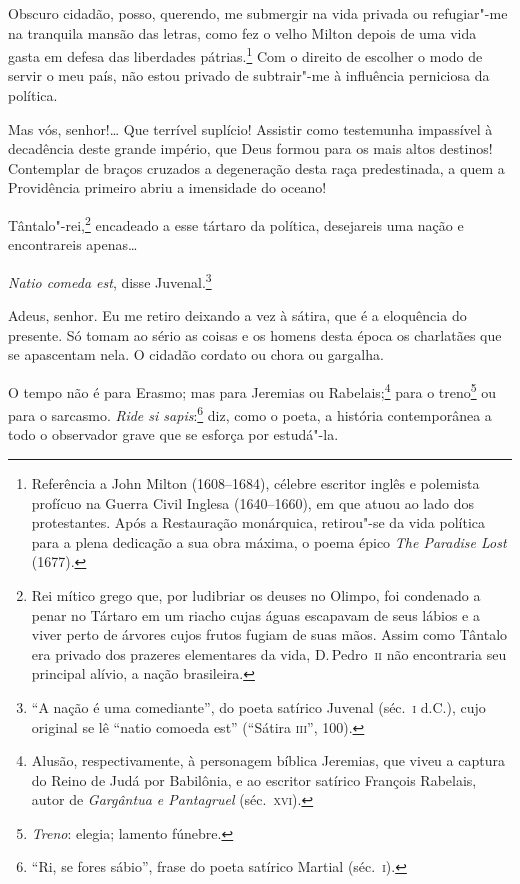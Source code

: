 \begin{linenumbers}
 Obscuro cidadão, posso, querendo, me submergir na vida privada ou
refugiar"-me na tranquila mansão das letras, como fez o velho Milton
depois de uma vida gasta em defesa das liberdades
pátrias.\footnote{ Referência a John Milton (1608--1684), célebre escritor inglês e
polemista profícuo na Guerra Civil Inglesa (1640--1660), em que atuou
ao lado dos protestantes. Após a Restauração monárquica, retirou"-se
da vida política para a plena dedicação a sua obra máxima, o poema
épico \textit{The Paradise Lost} (1677).}
 Com o direito de escolher o modo de servir o meu país, não estou
privado de subtrair"-me à influência perniciosa da política.

 Mas vós, senhor!\ldots{} Que terrível suplício! Assistir como testemunha
impassível à decadência deste grande império, que Deus formou para os
mais altos destinos! Contemplar de braços cruzados a degeneração desta
raça predestinada, a quem a Providência primeiro abriu a imensidade do oceano!

 Tântalo"-rei,\footnote{ Rei mítico grego que, por ludibriar os deuses no Olimpo, foi condenado
a penar no Tártaro em um riacho cujas águas escapavam de seus lábios e
a viver perto de árvores cujos frutos fugiam de suas mãos. Assim como
Tântalo era privado dos prazeres elementares da vida, D.\,Pedro~\textsc{ii} não
encontraria seu principal alívio, a nação brasileira.}
 encadeado a esse tártaro da política, desejareis uma nação e
encontrareis apenas\ldots{}

 \textit{Natio comeda est}, disse
Juvenal.\footnote{ ``A nação é uma comediante'', do poeta satírico Juvenal 
(séc.~\textsc{i} d.C.), cujo original se lê ``natio comoeda est'' 
(``Sátira \textsc{iii}'', 100).}


 Adeus, senhor. Eu me retiro deixando a vez à sátira, que é a eloquência
do presente. Só tomam ao sério as coisas e os homens desta época os
charlatães que se apascentam nela. O cidadão cordato ou chora ou gargalha.

 O tempo não é para Erasmo; mas para Jeremias ou
Rabelais;\footnote{ Alusão, respectivamente, à personagem bíblica Jeremias, que viveu a
captura do Reino de Judá por Babilônia, e ao escritor satírico François
Rabelais, autor de \textit{Gargântua e Pantagruel} (séc.~\textsc{xvi}).}
 para o treno\footnote{ \textit{Treno}: elegia; lamento fúnebre.}
 ou para o sarcasmo. \textit{Ride si sapis}:\footnote{ ``Ri, se
fores sábio'', frase do poeta satírico Martial (séc.~\textsc{i}).}
 diz, como o poeta, a história contemporânea a todo o observador grave
que se esforça por estudá"-la. 


\end{linenumbers}
